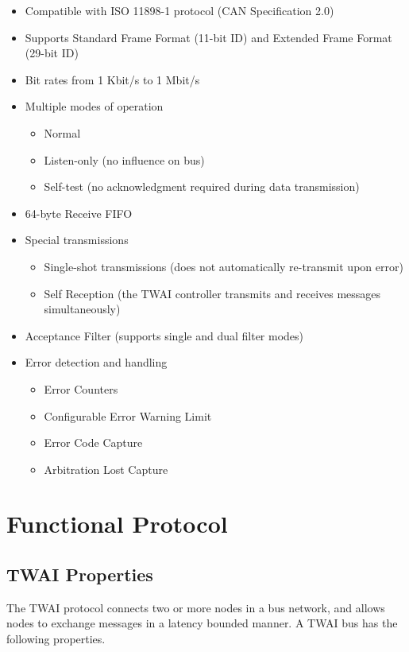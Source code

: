 \documentclass[main\_\_EN.tex]{subfiles}
\begin{document}
\begin{itemize}
    \item Compatible with ISO 11898-1 protocol (CAN Specification 2.0)
    \item Supports Standard Frame Format (11-bit ID) and Extended Frame Format (29-bit ID)
    \item Bit rates from 1 Kbit/s to 1 Mbit/s
    \item Multiple modes of operation
    \begin{itemize}
        \item Normal
        \item Listen-only (no influence on bus)
        \item Self-test (no acknowledgment required during data transmission)
    \end{itemize}
    \item 64-byte Receive FIFO
    \item Special transmissions
    \begin{itemize}
        \item Single-shot transmissions (does not automatically re-transmit upon error)
        \item Self Reception (the TWAI controller transmits and receives messages simultaneously)
    \end{itemize}
    \item Acceptance Filter (supports single and dual filter modes)
    \item Error detection and handling
    \begin{itemize}
        \item Error Counters
        \item Configurable Error Warning Limit
        \item Error Code Capture
        \item Arbitration Lost Capture
    \end{itemize}
\end{itemize}

\section{Functional Protocol}
\label{sec:twai-functional-protocol}

\subsection{TWAI Properties}

The TWAI protocol connects two or more nodes in a bus network, and allows nodes to exchange messages in a latency bounded manner. A TWAI bus has the following properties.
\end{document}
